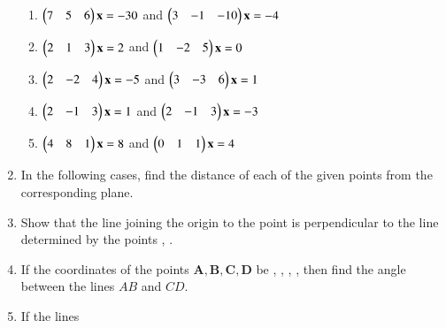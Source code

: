 \begin{enumerate}[label=\arabic*.,ref=\thesubsection.\theenumi]
\begin{enumerate}
\item 
$
\begin{pmatrix}7 & 5 & 6\end{pmatrix}\mathbf{x}=-30
$
 and 
$
\begin{pmatrix}3 & -1 & -10\end{pmatrix}\mathbf{x}=-4
$
%
\item 
$
\begin{pmatrix}2 & 1 & 3\end{pmatrix}\mathbf{x}=2
$
 and 
$
\begin{pmatrix}1 & -2 & 5\end{pmatrix}\mathbf{x}=0
$
%
\item 
$
\begin{pmatrix}2 & -2 & 4\end{pmatrix}\mathbf{x}=-5
$
 and 
$
\begin{pmatrix}3 & -3 & 6\end{pmatrix}\mathbf{x}=1
$
\item 
$
\begin{pmatrix}2 & -1 & 3\end{pmatrix}\mathbf{x}=1
$
 and 
$
\begin{pmatrix}2 & -1 & 3\end{pmatrix}\mathbf{x}=-3
$
\item 
$
\begin{pmatrix}4 & 8 & 1\end{pmatrix}\mathbf{x}=8
$
 and 
$
\begin{pmatrix}0 & 1 & 1\end{pmatrix}\mathbf{x}=4
$
\end{enumerate}
\item In the following cases, find the distance of each of the given points from the corresponding plane.
\begin{table}[!h]
\centering

\caption{}
\label{table:3d}
\end{table}
%
\item Show that the line joining the origin to the point  is perpendicular to the line determined by the points , .
\item If the coordinates of the points $\bm{A}, \bm{B}, \bm{C}, \bm{D}$ be , , , , then find the angle between the lines $AB$ and $CD$.  
%
\item If the lines 
\begin{align}

\end{align}
\end{enumerate}
